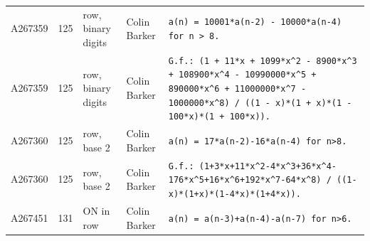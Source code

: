 \documentclass[11pt]{article}
\theoremstyle{definition}
\theoremstyle{remark}
\begin{document}
{\begin{longtable}{p{1.3cm}p{0.7cm}p{2.4cm}p{2.3cm}p{7.3cm}}
A267359 & 125 & row, binary digits & Colin Barker & \texttt{a(n)\allowbreak{} \allowbreak{}=\allowbreak{} \allowbreak{}10001*\allowbreak{}a(n-\allowbreak{}2)\allowbreak{} \allowbreak{}-\allowbreak{} \allowbreak{}10000*\allowbreak{}a(n-\allowbreak{}4)\allowbreak{} \allowbreak{}for \allowbreak{}n \allowbreak{}> \allowbreak{}8.} \\
A267359 & 125 & row, binary digits & Colin Barker & \texttt{G.f.: \allowbreak{}(1 \allowbreak{}+\allowbreak{} \allowbreak{}11*\allowbreak{}x \allowbreak{}+\allowbreak{} \allowbreak{}1099*\allowbreak{}x\^{}2 \allowbreak{}-\allowbreak{} \allowbreak{}8900*\allowbreak{}x\^{}3 \allowbreak{}+\allowbreak{} \allowbreak{}108900*\allowbreak{}x\^{}4 \allowbreak{}-\allowbreak{} \allowbreak{}10990000*\allowbreak{}x\^{}5 \allowbreak{}+\allowbreak{} \allowbreak{}890000*\allowbreak{}x\^{}6 \allowbreak{}+\allowbreak{} \allowbreak{}11000000*\allowbreak{}x\^{}7 \allowbreak{}-\allowbreak{} \allowbreak{}1000000*\allowbreak{}x\^{}8)\allowbreak{} \allowbreak{}/\allowbreak{} \allowbreak{}((1 \allowbreak{}-\allowbreak{} \allowbreak{}x)\allowbreak{}*\allowbreak{}(1 \allowbreak{}+\allowbreak{} \allowbreak{}x)\allowbreak{}*\allowbreak{}(1 \allowbreak{}-\allowbreak{} \allowbreak{}100*\allowbreak{}x)\allowbreak{}*\allowbreak{}(1 \allowbreak{}+\allowbreak{} \allowbreak{}100*\allowbreak{}x)\allowbreak{})\allowbreak{}.} \\
A267360 & 125 & row, base 2 & Colin Barker & \texttt{a(n)\allowbreak{} \allowbreak{}=\allowbreak{} \allowbreak{}17*\allowbreak{}a(n-\allowbreak{}2)\allowbreak{}-\allowbreak{}16*\allowbreak{}a(n-\allowbreak{}4)\allowbreak{} \allowbreak{}for \allowbreak{}n>8.} \\
A267360 & 125 & row, base 2 & Colin Barker & \texttt{G.f.: \allowbreak{}(1+\allowbreak{}3*\allowbreak{}x+\allowbreak{}11*\allowbreak{}x\^{}2-\allowbreak{}4*\allowbreak{}x\^{}3+\allowbreak{}36*\allowbreak{}x\^{}4-\allowbreak{}176*\allowbreak{}x\^{}5+\allowbreak{}16*\allowbreak{}x\^{}6+\allowbreak{}192*\allowbreak{}x\^{}7-\allowbreak{}64*\allowbreak{}x\^{}8)\allowbreak{} \allowbreak{}/\allowbreak{} \allowbreak{}((1-\allowbreak{}x)\allowbreak{}*\allowbreak{}(1+\allowbreak{}x)\allowbreak{}*\allowbreak{}(1-\allowbreak{}4*\allowbreak{}x)\allowbreak{}*\allowbreak{}(1+\allowbreak{}4*\allowbreak{}x)\allowbreak{})\allowbreak{}.} \\
A267451 & 131 & ON in row & Colin Barker & \texttt{a(n)\allowbreak{} \allowbreak{}=\allowbreak{} \allowbreak{}a(n-\allowbreak{}3)\allowbreak{}+\allowbreak{}a(n-\allowbreak{}4)\allowbreak{}-\allowbreak{}a(n-\allowbreak{}7)\allowbreak{} \allowbreak{}for \allowbreak{}n>6.} \\

\end{longtable}}
\end{document}
